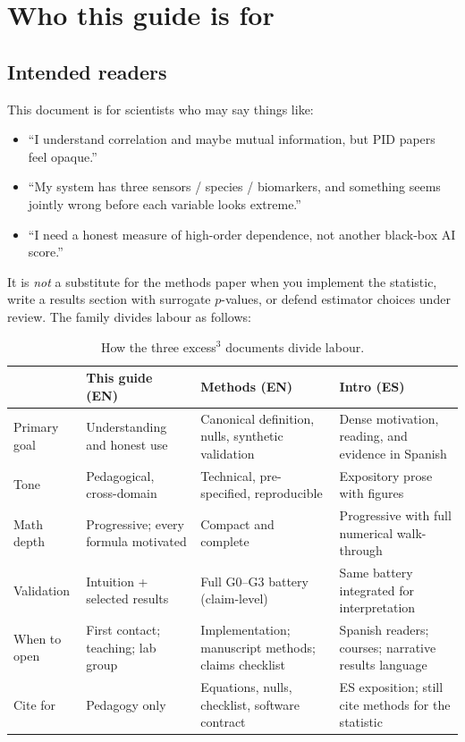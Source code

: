 \documentclass[11pt,a4paper]{article}
\begin{document}
\tableofcontents
\newpage

\section{Who this guide is for}
\label{sec:audience}

\subsection{Intended readers}

This document is for scientists who may say things like:
\begin{itemize}[leftmargin=*,itemsep=2pt]
  \item ``I understand correlation and maybe mutual information, but PID
  papers feel opaque.''
  \item ``My system has three sensors / species / biomarkers, and something
  seems jointly wrong before each variable looks extreme.''
  \item ``I need a honest measure of high-order dependence, not another
  black-box AI score.''
\end{itemize}

It is \emph{not} a substitute for the methods paper when you implement the
statistic, write a results section with surrogate $p$-values, or defend
estimator choices under review. The family divides labour as follows:

\begin{table}[H]
\centering
\caption{How the three excess$^3$ documents divide labour.}
\label{tab:three_docs}
\small
\begin{tabularx}{\textwidth}{@{}>{\raggedright\arraybackslash}p{2.4cm}X X X@{}}
\toprule
 & \textbf{This guide (EN)}
 & \textbf{Methods (EN)}
 & \textbf{Intro (ES)} \\
\midrule
Primary goal
  & Understanding and honest use
  & Canonical definition, nulls, synthetic validation
  & Dense motivation, reading, and evidence in Spanish \\
Tone
  & Pedagogical, cross-domain
  & Technical, pre-specified, reproducible
  & Expository prose with figures \\
Math depth
  & Progressive; every formula motivated
  & Compact and complete
  & Progressive with full numerical walk-through \\
Validation
  & Intuition + selected results
  & Full G0--G3 battery (claim-level)
  & Same battery integrated for interpretation \\
When to open
  & First contact; teaching; lab group
  & Implementation; manuscript methods; claims checklist
  & Spanish readers; courses; narrative results language \\
Cite for
  & Pedagogy only
  & Equations, nulls, checklist, software contract
  & ES exposition; still cite methods for the statistic \\
\bottomrule
\end{tabularx}
\end{table}
\end{document}
